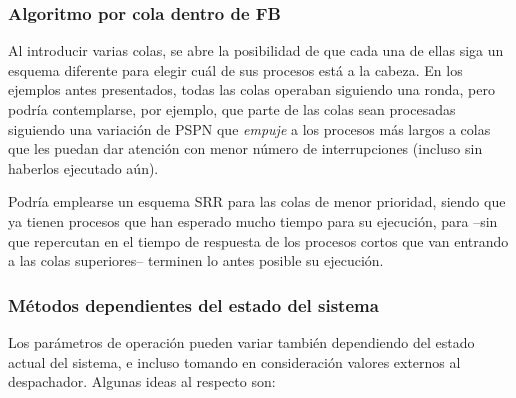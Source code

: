 \documentclass[11pt,fleqn]{book} %
\begin{document}
\subsubsection{Algoritmo por cola dentro de FB}
\label{sec-4-2-8-1}


Al introducir varias colas, se abre la posibilidad de que cada una de
ellas siga un esquema diferente para elegir cuál de sus procesos está
a la cabeza. En los ejemplos antes presentados, todas las colas
operaban siguiendo una ronda, pero podría contemplarse, por ejemplo,
que parte de las colas sean procesadas siguiendo una variación de PSPN
que \emph{empuje} a los procesos más largos a colas que les puedan dar
atención con menor número de interrupciones (incluso sin haberlos
ejecutado aún).

Podría emplearse un esquema SRR para las colas de menor prioridad,
siendo que ya tienen procesos que han esperado mucho tiempo para su
ejecución, para –sin que repercutan en el tiempo de respuesta de
los procesos cortos que van entrando a las colas superiores– terminen
lo antes posible su ejecución.
\subsubsection{Métodos dependientes del estado del sistema}
\label{sec-4-2-8-2}


Los parámetros de operación pueden variar también dependiendo del
estado actual del sistema, e incluso tomando en consideración valores
externos al despachador. Algunas ideas al respecto son:
\end{document}

